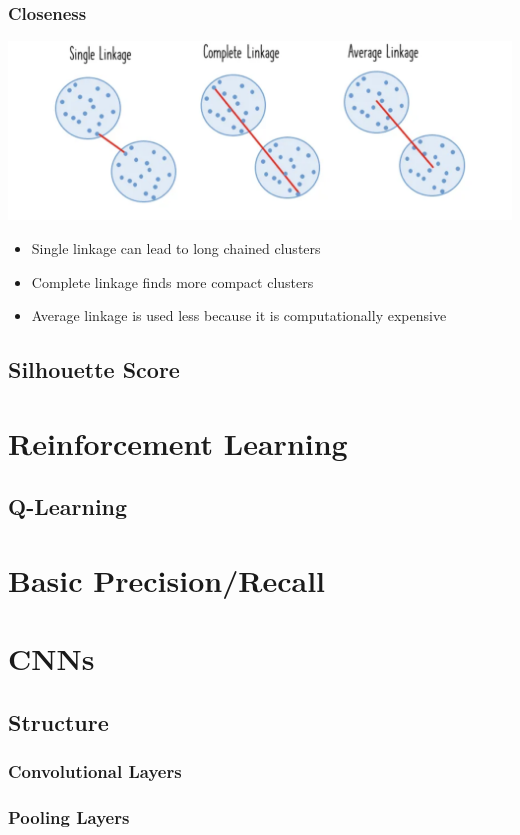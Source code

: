 \documentclass[10pt]{report}
\begin{document}
\subsection{Closeness}
\includegraphics[width=\textwidth]{linkage.png}
\begin{itemize}
  \item Single linkage can lead to long chained clusters
  \item Complete linkage finds more compact clusters
  \item Average linkage is used less because it is computationally expensive
\end{itemize}
\section{Silhouette Score}

\chapter{Reinforcement Learning}
\section{Q-Learning}

\chapter{Basic Precision/Recall}

\chapter{CNNs}
\section{Structure}
\subsection{Convolutional Layers}
\subsection{Pooling Layers}
\end{document}
